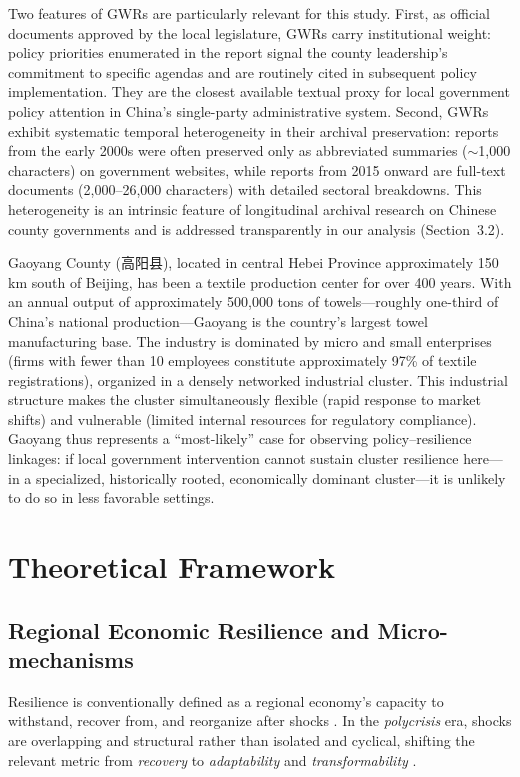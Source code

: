 \documentclass[sustainability,article,submit,moreauthors,pdftex]{mdpi}
\begin{document}
Two features of GWRs are particularly relevant for this study. First, as official documents approved by the local legislature, GWRs carry institutional weight: policy priorities enumerated in the report signal the county leadership's commitment to specific agendas and are routinely cited in subsequent policy implementation. They are the closest available textual proxy for local government policy attention in China's single-party administrative system. Second, GWRs exhibit systematic temporal heterogeneity in their archival preservation: reports from the early 2000s were often preserved only as abbreviated summaries ($\sim$1,000 characters) on government websites, while reports from 2015 onward are full-text documents (2,000--26,000 characters) with detailed sectoral breakdowns. This heterogeneity is an intrinsic feature of longitudinal archival research on Chinese county governments and is addressed transparently in our analysis (Section~3.2).

Gaoyang County (高阳县), located in central Hebei Province approximately 150 km south of Beijing, has been a textile production center for over 400 years. With an annual output of approximately 500,000 tons of towels---roughly one-third of China's national production---Gaoyang is the country's largest towel manufacturing base. The industry is dominated by micro and small enterprises (firms with fewer than 10 employees constitute approximately 97\% of textile registrations), organized in a densely networked industrial cluster. This industrial structure makes the cluster simultaneously flexible (rapid response to market shifts) and vulnerable (limited internal resources for regulatory compliance). Gaoyang thus represents a ``most-likely'' case for observing policy--resilience linkages: if local government intervention cannot sustain cluster resilience here---in a specialized, historically rooted, economically dominant cluster---it is unlikely to do so in less favorable settings.

\section{Theoretical Framework}\label{sec:theory}

\subsection{Regional Economic Resilience and Micro-mechanisms}
Resilience is conventionally defined as a regional economy's capacity to withstand, recover from, and reorganize after shocks \citep{Martin2012, Martin2015, Boschma2015}. In the \emph{polycrisis} era, shocks are overlapping and structural rather than isolated and cyclical, shifting the relevant metric from \emph{recovery} to \emph{adaptability} and \emph{transformability} \citep{Bristow2014, Sutton2023}.
\end{document}
